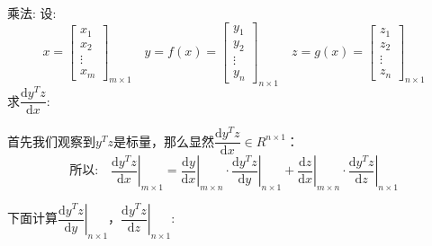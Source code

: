 \documentclass[withoutpreface,bwprint]{cumcmthesis} %
\begin{document}
	乘法:
	设:\begin{equation*}
		x=\left[
			\begin{array}{c}
			x_1\\
			x_2\\
			\vdots\\
			x_m
		\end{array}
		\right]_{m{\times}1} \quad   y=f(x)=\left[
		\begin{array}{c}
			y_1\\
			y_2\\
			\vdots\\
			y_n
		\end{array}
		\right]_{n{\times}1}  
		\quad   z=g(x)=\left[
		\begin{array}{c}
			z_1\\
			z_2\\
			\vdots\\
			z_n
		\end{array}
		\right]_{n{\times}1}
	\end{equation*}
	求$\dfrac{\mathrm{d} y^{T}z}{\mathrm{d} x}$:\\
	\par 首先我们观察到$ y^{T}z$是标量，那么显然$\dfrac{\mathrm{d} y^{T}z}{\mathrm{d} x} \in R^{n{\times}1}$：
	\begin{equation}
		\text{所以:} \quad 
		\left.\dfrac{\mathrm{d} y^{T}z}{\mathrm{d} x}\right|_{m{\times}1}
		=
		\left.\dfrac{\mathrm{d} y}{\mathrm{d} x}\right|_{m{\times}n}
		\cdot
		\left.\dfrac{\mathrm{d} y^{T}z}{\mathrm{d} y}\right|_{n{\times}1}
		+
		\left.\dfrac{\mathrm{d} z}{\mathrm{d} x}\right|_{m{\times}n}
		\cdot
		\left.\dfrac{\mathrm{d} y^{T}z}{\mathrm{d} z}\right|_{n{\times}1}
	\end{equation}
	\par 下面计算$\left.\dfrac{\mathrm{d} y^{T}z}{\mathrm{d} y}\right|_{n{\times}1}$，$\left.\dfrac{\mathrm{d} y^{T}z}{\mathrm{d} z}\right|_{n{\times}1}$:
\end{document}
